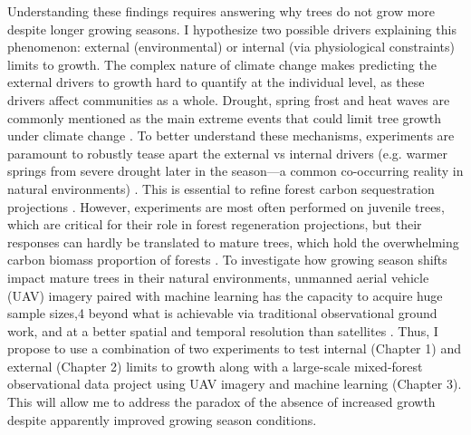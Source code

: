 \documentclass[12pt]{article}
\begin{document}
Understanding these findings requires answering why trees do not grow more despite longer growing seasons. I hypothesize two possible drivers explaining this phenomenon: external (environmental) \cite{kolar_response_2016} or internal (via physiological constraints)\cite{zohner_effect_2023} limits to growth. The complex nature of climate change makes predicting the external drivers to growth hard to quantify at the individual level, as these drivers affect communities as a whole. Drought, spring frost and heat waves are commonly mentioned as the main extreme events that could limit tree growth under climate change \cite{tyree_xylem_2002, choat_triggers_2018, li_widespread_2023,trenberth_global_2014,intergovernmental_panel_on_climate_change_detection_2014,chiang_evidence_2021,polgar_leafout_2011,reinmann_compensatory_2023}. To better understand these mechanisms, experiments are paramount to robustly tease apart the external vs internal drivers (e.g. warmer springs from severe drought later in the season---a common co-occurring reality in natural environments) \cite{morin_changes_2010,primack_observations_2015}. This is essential to refine forest carbon sequestration projections \cite{green_limits_2022,cabon_cross-biome_2022}. However, experiments are most often performed on juvenile trees, which are critical for their role in forest regeneration projections, but their responses can hardly be translated to mature trees, which hold the overwhelming carbon biomass proportion of forests \cite{augspurger_differences_2003,silvestro_longer_2023,vitasse_ontogenic_2013}. To investigate how growing season shifts impact mature trees in their natural environments, unmanned aerial vehicle (UAV) imagery paired with machine learning has the capacity to acquire huge sample sizes,4 beyond what is achievable via traditional observational ground work, and at a better spatial and temporal resolution than satellites \cite{berra_assessing_2019,piao_plant_2019,teng_bringing_2025}. Thus, I propose to use a combination of two experiments to test internal (Chapter 1) and external (Chapter 2) limits to growth along with a large-scale mixed-forest observational data project using UAV imagery and machine learning (Chapter 3). This will allow me to address the paradox of the absence of increased growth despite apparently improved growing season conditions. 
\end{document}

